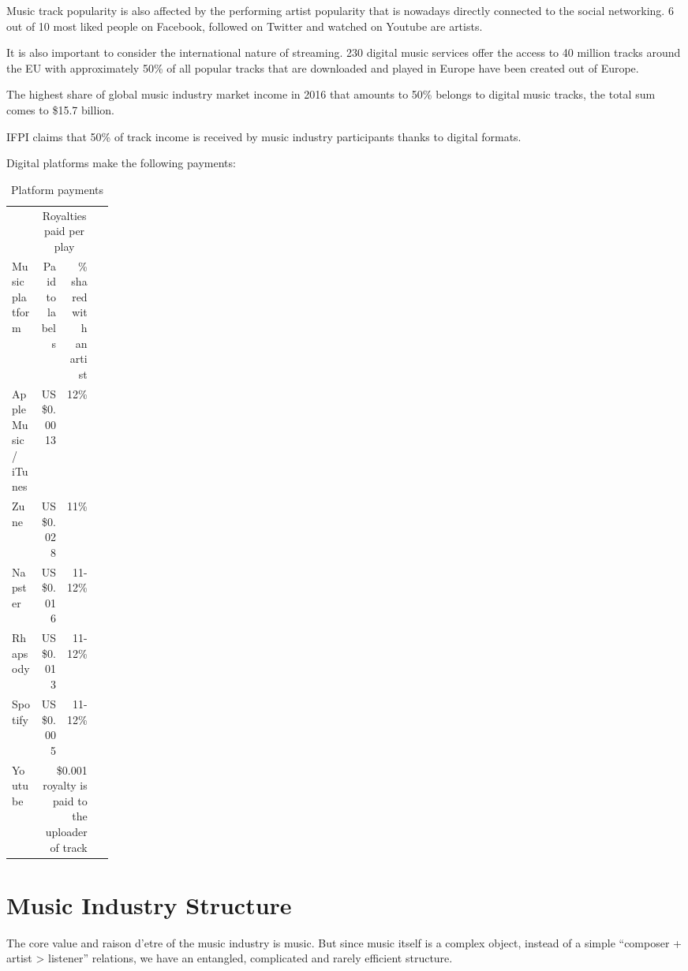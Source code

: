 \documentclass[12pt]{report}
\newcommand{\hlc}[1]{\colorbox{yellow!25}{#1}}
\begin{document}
Music track popularity is also affected by the performing artist popularity that is nowadays directly connected to the social networking. 6 out of 10 most liked people on Facebook, followed on Twitter and watched on Youtube are artists.

It is also important to consider the international nature of streaming. 230 digital music services offer the access to 40 million tracks around the EU with approximately 50\% of all popular tracks that are downloaded and played in Europe have been created out of Europe.

The highest share of global music industry market income in 2016 that amounts to 50\% belongs to digital music tracks, the total sum comes to \$15.7 billion.
 
IFPI claims that 50\% of track income is received by music industry participants thanks to digital formats.
 
Digital platforms make the following payments:

\def\PayPlay{Royalties paid per play}
\def\PayBuy{Оплата при покупке песни}
\def\Platform{Music platform}
\def\LabelPartion{Paid to labels}
\def\ArtistPartion{\hlc{\% shared with an artist}}
\def\YoutubePay{\$0.001 royalty is paid to the uploader of track}

\begin{table}[H]
\centering
\caption{Platform payments}
\begin{tabular}{lrrp{0.15\linewidth}}
\toprule
	& \multicolumn{2}{c}{\PayPlay} \\
	\Platform & 
	\multicolumn{1}{p{0.22\linewidth}}{\LabelPartion} &
	\multicolumn{1}{p{0.22\linewidth}}{\ArtistPartion} \\
\bottomrule
\midrule
Apple Music / iTunes		& US \$0.0013 	& 12\% \\
Zune								& US \$0.028 	& 11\% \\
Napster						& US \$0.016 	& 11-12\% \\
Rhapsody						& US \$0.013 	& 11-12\% \\
Spotify							& US \$0.005 	& 11-12\% \\
Youtube 						& \multicolumn{2}{p{0.48\linewidth}}{\YoutubePay} \\
\bottomrule
\end{tabular}
\end{table}


\vfill\null\pagebreak
\section{Music Industry Structure}
\label{industry-structure}
The core value and raison d’etre of the music industry is music. But since music itself is a complex object, instead of a simple “composer + artist > listener” relations, we have an entangled, complicated and rarely efficient structure.
\end{document}
